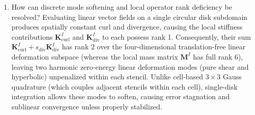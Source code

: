 \documentclass[VANCOUVER,Times1COL]{WileyNJD-v5}
\begin{document}
\begin{enumerate}
    \item How can discrete mode softening and local operator rank deficiency be resolved? Evaluating linear vector fields on a single circular disk subdomain produces spatially constant curl and divergence, causing the local stiffness contributions $\mathbf{K}_{\mathrm{curl}}^I$ and $\mathbf{K}_{\mathrm{div}}^I$ to each possess rank 1. Consequently, their sum $\mathbf{K}_{\mathrm{curl}}^I + s_{\mathrm{div}}\mathbf{K}_{\mathrm{div}}^I$ has rank 2 over the four-dimensional translation-free linear deformation subspace (whereas the local mass matrix $\mathbf{M}^I$ has full rank 6), leaving two harmonic zero-energy linear deformation modes (pure shear and hyperbolic) unpenalized within each stencil. Unlike cell-based $3\times 3$ Gauss quadrature (which couples adjacent stencils within each cell), single-disk integration allows these modes to soften, causing error stagnation and sublinear convergence unless properly stabilized.
\end{enumerate}
\end{document}
